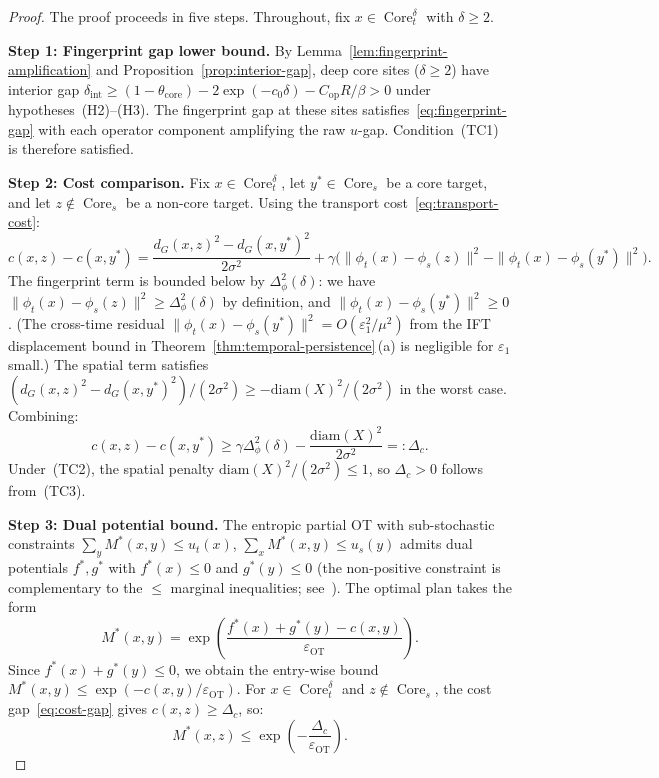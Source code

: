 \documentclass[lettersize,journal]{IEEEtran}
\DeclareMathOperator{\Core}{Core}
\begin{document}
\begin{proof}
The proof proceeds in five steps. Throughout, fix $x \in \Core_t^\delta$ with $\delta \geq 2$.

\medskip\noindent\textbf{Step 1: Fingerprint gap lower bound.}
By Lemma~\ref{lem:fingerprint-amplification} and Proposition~\ref{prop:interior-gap}, deep core sites ($\delta \geq 2$) have interior gap $\delta_{\mathrm{int}} \geq (1 - \theta_{\mathrm{core}}) - 2\exp(-c_0\delta) - C_{\mathrm{op}}R/\beta > 0$ under hypotheses~(H2)--(H3). The fingerprint gap at these sites satisfies~\eqref{eq:fingerprint-gap} with each operator component amplifying the raw $u$-gap. Condition~(TC1) is therefore satisfied.

\medskip\noindent\textbf{Step 2: Cost comparison.}
Fix $x \in \Core_t^\delta$, let $y^* \in \Core_s$ be a core target, and let $z \notin \Core_s$ be a non-core target. Using the transport cost~\eqref{eq:transport-cost}:
\[
c(x,z) - c(x,y^*) = \frac{d_G(x,z)^2 - d_G(x,y^*)^2}{2\sigma^2} + \gamma\bigl(\|\phi_t(x) - \phi_s(z)\|^2 - \|\phi_t(x) - \phi_s(y^*)\|^2\bigr).
\]
The fingerprint term is bounded below by $\Delta_\phi^2(\delta)$: we have $\|\phi_t(x) - \phi_s(z)\|^2 \geq \Delta_\phi^2(\delta)$ by definition, and $\|\phi_t(x) - \phi_s(y^*)\|^2 \geq 0$. (The cross-time residual $\|\phi_t(x) - \phi_s(y^*)\|^2 = O(\varepsilon_1^2/\mu^2)$ from the IFT displacement bound in Theorem~\ref{thm:temporal-persistence}\,(a) is negligible for $\varepsilon_1$ small.)
The spatial term satisfies $(d_G(x,z)^2 - d_G(x,y^*)^2)/(2\sigma^2) \geq -\mathrm{diam}(X)^2/(2\sigma^2)$ in the worst case. Combining:
\begin{equation}
\label{eq:cost-gap}
c(x,z) - c(x,y^*) \geq \gamma\Delta_\phi^2(\delta) - \frac{\mathrm{diam}(X)^2}{2\sigma^2} =: \Delta_c.
\end{equation}
Under~(TC2), the spatial penalty $\mathrm{diam}(X)^2/(2\sigma^2) \leq 1$, so $\Delta_c > 0$ follows from~(TC3).

\medskip\noindent\textbf{Step 3: Dual potential bound.}
The entropic partial OT with sub-stochastic constraints $\sum_y M^*(x,y) \leq u_t(x)$, $\sum_x M^*(x,y) \leq u_s(y)$ admits dual potentials $f^*, g^*$ with $f^*(x) \leq 0$ and $g^*(y) \leq 0$ (the non-positive constraint is complementary to the $\leq$ marginal inequalities; see~\cite[\S4.2]{Peyre2019}). The optimal plan takes the form
\[
M^*(x,y) = \exp\!\left(\frac{f^*(x) + g^*(y) - c(x,y)}{\varepsilon_{\mathrm{OT}}}\right).
\]
Since $f^*(x) + g^*(y) \leq 0$, we obtain the entry-wise bound $M^*(x,y) \leq \exp(-c(x,y)/\varepsilon_{\mathrm{OT}})$. For $x \in \Core_t^\delta$ and $z \notin \Core_s$, the cost gap~\eqref{eq:cost-gap} gives $c(x,z) \geq \Delta_c$, so:
\begin{equation}
\label{eq:entry-bound}
M^*(x,z) \leq \exp\!\left(-\frac{\Delta_c}{\varepsilon_{\mathrm{OT}}}\right).
\end{equation}


\end{proof}
\end{document}
